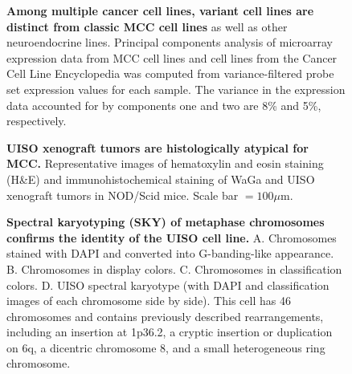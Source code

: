 \documentclass[10pt]{article}
\begin{document}
\begin{figure}[!ht]
  \begin{center}
  \end{center}

  \caption{
    {\bf Among multiple cancer cell lines, variant cell lines are distinct from classic MCC cell lines} as well as other neuroendocrine lines.
    Principal components analysis of microarray expression data from MCC cell lines and cell lines from the Cancer Cell Line Encyclopedia was computed from variance-filtered probe set expression values for each sample.
    The variance in the expression data accounted for by components one and two are 8\% and 5\%, respectively.}

  \label{fig:pcaccle}
\end{figure}

\begin{figure}[!ht]
  \begin{center}
  \end{center}

  \caption{
    {\bf UISO xenograft tumors are histologically atypical for MCC.}
    Representative images of hematoxylin and eosin staining (H\&E) and immunohistochemical staining of WaGa and UISO xenograft tumors in NOD/Scid mice.
    Scale bar $=100\mu\mathrm{m}$.}

  \label{fig:ihc}
\end{figure}



\begin{figure}[!ht]
  \begin{center}
  \end{center}
  
  \caption{
    {\bf Spectral karyotyping (SKY) of metaphase chromosomes confirms the identity of the UISO cell line.} 
    A. Chromosomes stained with DAPI and converted into G-banding-like appearance.
    B. Chromosomes in display colors.
    C. Chromosomes in classification colors.
    D. UISO spectral karyotype (with DAPI and classification images of each chromosome side by side).
    This cell has 46 chromosomes and contains previously described rearrangements, including an insertion at 1p36.2, a cryptic insertion or duplication on 6q, a dicentric chromosome 8, and a small heterogeneous ring chromosome.}

  \label{fig:sky}
\end{figure}
\end{document}
